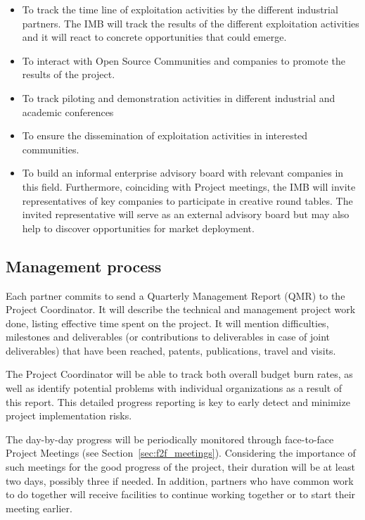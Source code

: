 \documentclass[a4paper,11pt]{article}
\begin{document}
\begin{itemize}

\item To track the time line of exploitation activities by the different industrial partners. The IMB will track the results of the different exploitation activities and it will react to concrete opportunities that could emerge.
\item To interact with Open Source Communities and companies to promote the results of the project.
\item To track piloting and demonstration activities in different industrial and academic conferences
\item To ensure the dissemination of exploitation activities in interested communities.
\item To build an informal enterprise advisory board with relevant companies in this field. Furthermore, coinciding with Project meetings, the IMB will invite representatives of key companies to participate in creative round tables. The invited representative will serve as an external advisory board but may also help to discover opportunities for market deployment.    \end{itemize}

\subsection{Management process}

Each partner commits to send a Quarterly Management Report (QMR) to the Project Coordinator. 
It will describe the technical and management project work done, listing effective time spent on the project. 
It will mention difficulties, milestones and deliverables (or contributions to deliverables in case of joint deliverables) that have been reached, patents, publications,
travel and visits. 

The Project Coordinator will be able to track both overall budget burn rates, as well as identify potential problems with individual organizations as a result of this report. This detailed progress reporting is key to early detect and minimize project implementation risks.

The day-by-day progress will be periodically monitored through face-to-face Project Meetings (see Section~\ref{sec:f2f_meetings}). Considering the importance of such meetings for the good progress of the project, their
duration will be at least two days, possibly three if needed. In
addition, partners who have common work to do together will receive facilities to continue working together or to start their meeting earlier.
\end{document}
